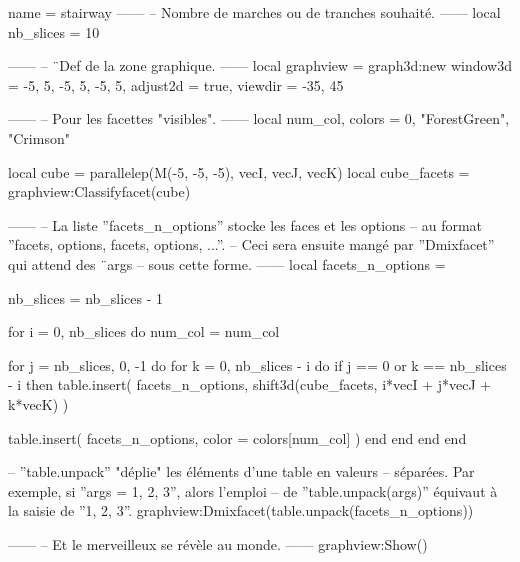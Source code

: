 \documentclass{standalone}
\begin{document}
\begin{luadraw}{name = stairway}
------
-- Nombre de marches ou de tranches souhaité.
------
local nb_slices = 10

------
-- ¨Def de la zone graphique.
------
local graphview = graph3d:new{
  window3d = {-5, 5, -5, 5, -5, 5},
  adjust2d = true,
  viewdir  = {-35, 45}
}

------
-- Pour les facettes "visibles".
------
local num_col, colors = 0, {"ForestGreen", "Crimson"}

local cube        = parallelep(M(-5, -5, -5), vecI, vecJ, vecK)
local cube_facets = graphview:Classifyfacet(cube)

------
-- La liste ''facets_n_options'' stocke les faces et les options
-- au format ''{facets, options, facets, options, ...}''.
-- Ceci sera ensuite mangé par ''Dmixfacet'' qui attend des ¨args
-- sous cette forme.
------
local facets_n_options = {}

nb_slices = nb_slices - 1

for i = 0, nb_slices do
  num_col = num_col%

  for j = nb_slices, 0, -1 do
    for k = 0, nb_slices - i do
      if j == 0 or k == nb_slices - i then
        table.insert(
          facets_n_options,
          shift3d(cube_facets, i*vecI + j*vecJ + k*vecK)
        )

        table.insert(
          facets_n_options,
          {
            color = colors[num_col]
          })
      end
    end
  end
end

-- ''table.unpack'' "déplie" les éléments d'une table en valeurs
-- séparées. Par exemple, si ''args = {1, 2, 3}'', alors l'emploi
-- de ''table.unpack(args)'' équivaut à la saisie de ''1, 2, 3''.
graphview:Dmixfacet(table.unpack(facets_n_options))

------
-- Et le merveilleux se révèle au monde.
------
graphview:Show()
\end{luadraw}
\end{document}
